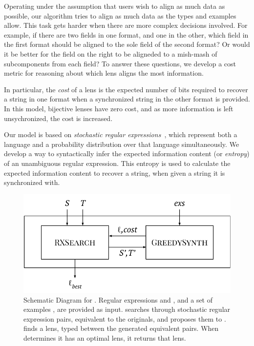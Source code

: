 \documentclass[acmsmall,screen,anonymous]{acmart}
\begin{document}
Operating under the assumption that users wish to align as much data as
possible, our algorithm tries to align as much data as the types and examples
allow. This task gets harder when there are more complex decisions involved. For
example, if there are two fields in one format, and one in the other, which field
in the first format should be aligned to the sole field of the second format? Or
would it be better for the field on the right to be aligneded to a mish-mash
of subcomponents from each field? To answer these questions, we develop a cost
metric for reasoning about which lens aligns the most information.

In particular, the \emph{cost} of a lens is the expected number of bits required to
recover a string in one format when a synchronized string in the other format is
provided. In this model, bijective lenses have zero cost, and as more
information is left unsychronized, the cost is increased.

Our model is based on \emph{stochastic regular expressions}~\cite{?}, which
represent both a language and a probability distribution over that language
simultaneously.  We develop a way to syntactically infer the expected
information content (or \emph{entropy}) of an unambiguous regular
expression. This entropy is used to calculate the expected information content
to recover a string, when given a string it is synchronized with.

\begin{figure}
  \includegraphics[width=.5\textwidth]{high-level-algorithm.pdf}
  \caption{Schematic Diagram for \SOptician. Regular expressions \Regex and
    \RegexAlt, and a set of examples \Examples, are provided as input. \RXSearch
    searches through stochastic regular expression pairs, equivalent to the
    originals, and proposes them to \GreedySynth. \GreedySynth finds a lens,
    typed between the generated equivalent pairs. When \RXSearch determines it
    has an optimal lens, it returns that lens.}
  \label{fig:high-level-algorithm}
\end{figure}
\end{document}
